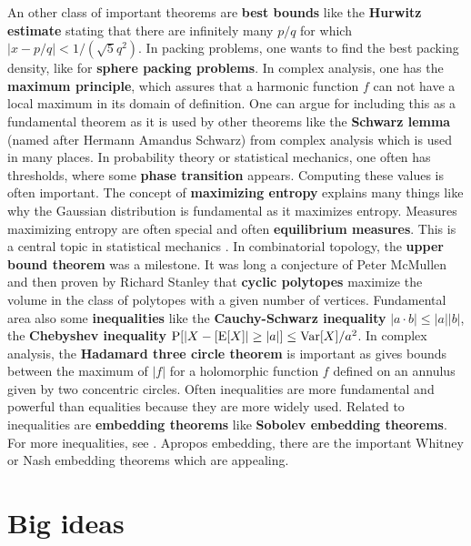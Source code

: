 \documentclass[12pt]{amsart}
\begin{document}
An other class of important theorems are
{\bf best bounds} like the {\bf Hurwitz estimate} stating that there are infinitely many $p/q$ for which
$|x-p/q| <1/(\sqrt{5} q^2)$. In packing problems, one wants to find the best packing density, like 
for {\bf sphere packing problems}. In complex analysis, one has the {\bf maximum principle}, which 
assures that a harmonic function $f$ can not have a local maximum in its domain of definition. One can
argue for including this as a fundamental theorem as it is used by other theorems like the 
{\bf Schwarz lemma} (named after Hermann Amandus Schwarz) from complex analysis which is used in
many places. In probability theory or statistical mechanics, one often has
thresholds, where some {\bf phase transition} appears. Computing these values is often important. 
The concept of {\bf maximizing entropy} explains many things like why the Gaussian 
distribution is fundamental as it maximizes entropy. Measures maximizing entropy are often special and
often {\bf equilibrium measures}. This is a central topic in statistical mechanics \cite{RuelleStatMech,
RuelleThermo}.  In combinatorial topology, the {\bf upper bound theorem} 
was a milestone. It was long a conjecture of Peter McMullen
and then proven by Richard Stanley that {\bf cyclic polytopes} maximize the volume in the class of polytopes
with a given number of vertices. 
Fundamental area also some {\bf inequalities} \cite{Inequalities} like the 
{\bf Cauchy-Schwarz inequality} $|a \cdot b| \leq |a| |b|$, 
the {\bf Chebyshev inequality} ${\rm P}[|X-[{\rm E}[X]| \geq |a|] \leq {\rm Var}[X]/a^2$. 
In complex analysis, the {\bf Hadamard three circle theorem} is important as gives bounds 
between the maximum of $|f|$ for a holomorphic function $f$ defined on an annulus given 
by two concentric circles. Often inequalities are more fundamental and powerful than 
equalities because they are more widely used. Related to inequalities are {\bf embedding theorems}
like {\bf Sobolev embedding theorems}.  For more inequalities, 
see \cite{DictionaryInequalities}. 
Apropos embedding, there are the important Whitney or Nash
embedding theorems which are appealing.  

\section*{Big ideas} 
\end{document}
